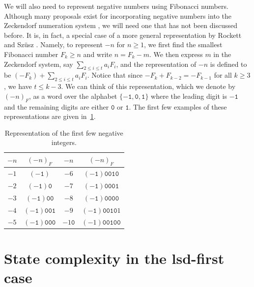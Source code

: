 \documentclass[12pt,runningheads]{llncs}
\newcommand{\tO}{\mathtt{0}}
\newcommand{\tL}{\mathtt{1}}
\begin{document}
We will also need to represent negative numbers using Fibonacci numbers. Although many proposals exist for incorporating negative numbers into the Zeckendorf numeration system
\cite{Bunder:1992,Hajnal:2023,Shallit&Shan:2023,Labbe&Lepsova:2023}, we will need one that has not been discussed before.  It is, in fact, a special case of a more general representation by Rockett and Sz\"usz \cite{Rockett&Szusz:1992}.  Namely, to represent $-n$ for $n \geq 1$, we first find the smallest Fibonacci number $F_k \geq n$ and  write $n = F_k - m$.
We then express $m$ in the Zeckendorf system, say $\sum_{2 \leq i \leq t} a_i F_{i}$, and the representation of $-n$ is defined to be $(-F_k) + \sum_{2 \leq i \leq t} a_i F_{i}$. Notice that since $-F_{k}+F_{k-2}=-F_{k-1}$ for all $k\geq 3$, we have $t\leq k-3$. We can think of this representation, which we denote by $(-n)_F$, as a word over the alphabet $\{ -\tL, \tO, \tL\}$ where the leading digit is $-\tL$ and the remaining digits are either $\tO$ or $\tL$. The first few examples of these representations are given in~\cref{tab1}.
\setlength{\textfloatsep}{15pt plus 2pt minus 4pt}
\setlength{\intextsep}{15pt plus 2pt minus 4pt}
\setlength{\abovecaptionskip}{5pt}
\setlength{\belowcaptionskip}{15pt}
\begin{table}[H]
\centering
\begin{tabular}{c|c||c|c}
   $-n$ & $(-n)_F$ & $-n$ & $(-n)_F$ \\ \hline
   $-1$ & $(-\tL)$ & $-6$ & $(-\tL) \tO \tO \tL \tO$ \\
   $-2$ & $(-\tL) \tO$ &  $-7$ & $(-\tL) \tO \tO \tO \tL$ \\
   $-3$ & $(-\tL) \tO\tO$ & $-8$ & $(-\tL) \tO \tO \tO \tO$\\
   $-4$ & $(-\tL) \tO \tO \tL$ & $-9$ & $(-\tL) \tO \tO \tL \tO 1$ \\
   $-5$&  $(-\tL) \tO \tO \tO$ & $-1\tO$ & $(-1) \tO \tO \tL \tO \tO$ \\
\end{tabular}
\caption{Representation of the first few negative integers.}
\label{tab1}
\end{table}





\section{State complexity in the lsd-first case}\label{sec:lsd}
\end{document}
